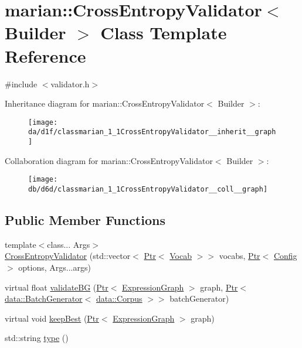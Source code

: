 \hypertarget{classmarian_1_1CrossEntropyValidator}{}\section{marian\+:\+:Cross\+Entropy\+Validator$<$ Builder $>$ Class Template Reference}
\label{classmarian_1_1CrossEntropyValidator}


{\ttfamily \#include $<$validator.\+h$>$}



Inheritance diagram for marian\+:\+:Cross\+Entropy\+Validator$<$ Builder $>$\+:
\nopagebreak
\begin{figure}[H]
\begin{center}
\leavevmode
\texttt{[image: da/d1f/classmarian\_1\_1CrossEntropyValidator\_\_inherit\_\_graph]}
\end{center}
\end{figure}


Collaboration diagram for marian\+:\+:Cross\+Entropy\+Validator$<$ Builder $>$\+:
\nopagebreak
\begin{figure}[H]
\begin{center}
\leavevmode
\texttt{[image: db/d6d/classmarian\_1\_1CrossEntropyValidator\_\_coll\_\_graph]}
\end{center}
\end{figure}
\subsection*{Public Member Functions}
\begin{DoxyCompactItemize}
\item 
{\footnotesize template$<$class... Args$>$ }\\\hyperlink{classmarian_1_1CrossEntropyValidator_afe80130ac707b42b56db3785a5ff89f1}{Cross\+Entropy\+Validator} (std\+::vector$<$ \hyperlink{namespacemarian_ad1a373be43a00ef9ce35666145137b08}{Ptr}$<$ \hyperlink{classmarian_1_1Vocab}{Vocab} $>$$>$ vocabs, \hyperlink{namespacemarian_ad1a373be43a00ef9ce35666145137b08}{Ptr}$<$ \hyperlink{classmarian_1_1Config}{Config} $>$ options, Args...\+args)
\item 
virtual float \hyperlink{classmarian_1_1CrossEntropyValidator_a2b49c37174062b22629073328997dd6c}{validate\+BG} (\hyperlink{namespacemarian_ad1a373be43a00ef9ce35666145137b08}{Ptr}$<$ \hyperlink{classmarian_1_1ExpressionGraph}{Expression\+Graph} $>$ graph, \hyperlink{namespacemarian_ad1a373be43a00ef9ce35666145137b08}{Ptr}$<$ \hyperlink{classmarian_1_1data_1_1BatchGenerator}{data\+::\+Batch\+Generator}$<$ \hyperlink{classmarian_1_1data_1_1Corpus}{data\+::\+Corpus} $>$$>$ batch\+Generator)
\item 
virtual void \hyperlink{classmarian_1_1CrossEntropyValidator_a18a18f95bfd4fc63653c06ed03ea612e}{keep\+Best} (\hyperlink{namespacemarian_ad1a373be43a00ef9ce35666145137b08}{Ptr}$<$ \hyperlink{classmarian_1_1ExpressionGraph}{Expression\+Graph} $>$ graph)
\item 
std\+::string \hyperlink{classmarian_1_1CrossEntropyValidator_a268534ff39447d8c5f95fba5bc18d458}{type} ()
\end{DoxyCompactItemize}
